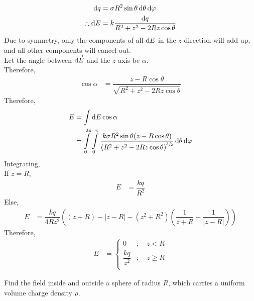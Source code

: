 \documentclass[fleqn, a4paper, 12pt, oneside]{amsart}
\theoremstyle{definition}
\theoremstyle{theorem}
\begin{document}
\begin{solution}
	\begin{align*}
		\dif q &= \sigma R^2 \sin \theta \dif \theta \dif \varphi\\
		\therefore \dif E &= k \dfrac{\dif q}{R^2 + z^2 - 2 R z \cos \theta}
	\end{align*}
	Due to symmetry, only the components of all $\dif E$ in the $z$ direction will add up, and all other components will cancel out.\\
	Let the angle between $\overrightarrow{\dif E}$ and the $z$-axis be $\alpha$.\\
	Therefore,
	\begin{align*}
		\cos \alpha &= \dfrac{z - R \cos \theta}{\sqrt{R^2 + z^2 - 2 R z \cos \theta}}
	\end{align*}
	Therefore,
	\begin{align*}
		E &= \int \dif E \cos \alpha\\
		&= \int\limits_{0}^{2 \pi} \int\limits_{0}^{\pi} \dfrac{k \sigma R^2 \sin \theta (z - R \cos \theta)}{\left( R^2 + z^2 - 2 R z \cos \theta \right)^{\sfrac{3}{2}}} \dif \theta \dif \varphi
	\end{align*}
	Integrating,\\
	If $z = R$,
	\begin{align*}
		E &= \dfrac{k q}{R^2}
	\end{align*}
	Else,
	\begin{align*}
		E &= \dfrac{k q}{4 R z^2} \left( (z + R) - |z - R| - (z^2 + R^2) \left( \dfrac{1}{z + R} - \dfrac{1}{|z - R|} \right) \right)
	\end{align*}
	Therefore,
	\begin{align*}
		E &= 
			\begin{cases}
				0 &;\quad z < R\\
				\dfrac{k q}{z^2} &;\quad z \geq R\\
			\end{cases}
	\end{align*}
\end{solution}

\begin{question}
	Find the field inside and outside a sphere of radius $R$, which carries a uniform volume charge density $\rho$.
\end{question}
\end{document}
